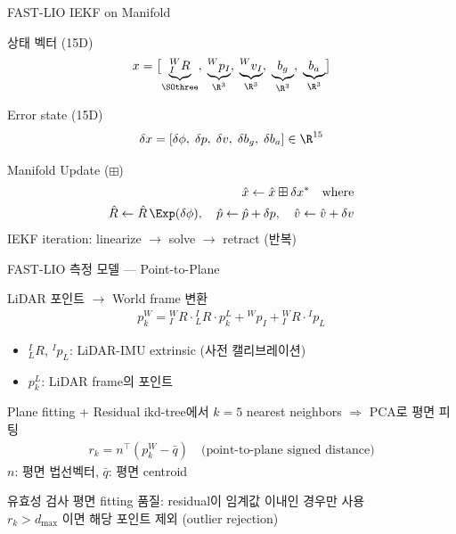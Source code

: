 \begin{frame}{FAST-LIO IEKF on Manifold}
  \begin{block}{상태 벡터 (15D)}
    \begin{align*}
      x = \bigl[\underbrace{{}^W_IR}_{\SOthree},\;
                \underbrace{{}^Wp_I}_{\R^3},\;
                \underbrace{{}^Wv_I}_{\R^3},\;
                \underbrace{b_g}_{\R^3},\;
                \underbrace{b_a}_{\R^3}\bigr]
    \end{align*}
  \end{block}
  \pause
  \begin{block}{Error state (15D)}
    \begin{align*}
      \delta x = [\delta\phi,\; \delta p,\; \delta v,\; \delta b_g,\; \delta b_a]
      \in \R^{15}
    \end{align*}
  \end{block}
  \pause
  \begin{block}{Manifold Update ($\boxplus$)}
    \begin{align*}
      \hat{x} \leftarrow \hat{x} \boxplus \delta x^* \quad \text{where}\\
      \hat{R} \leftarrow \hat{R}\,\Exp(\delta\phi), \quad
      \hat{p} \leftarrow \hat{p} + \delta p, \quad
      \hat{v} \leftarrow \hat{v} + \delta v
    \end{align*}
    IEKF iteration: linearize $\to$ solve $\to$ retract (반복)
  \end{block}
\end{frame}

\begin{frame}[shrink=20]{FAST-LIO 측정 모델 — Point-to-Plane}
  \begin{block}{LiDAR 포인트 $\to$ World frame 변환}
    \begin{align*}
      p_k^W = {}^W_IR \cdot {}^I_LR \cdot p_k^L
              + {}^Wp_I + {}^W_IR \cdot {}^Ip_L
    \end{align*}
    \begin{itemize}
      \item ${}^I_LR$, ${}^Ip_L$: LiDAR-IMU extrinsic (사전 캘리브레이션)
      \item $p_k^L$: LiDAR frame의 포인트
    \end{itemize}
  \end{block}
  \pause
  \begin{block}{Plane fitting + Residual}
    ikd-tree에서 $k=5$ nearest neighbors $\Rightarrow$ PCA로 평면 피팅\\
    \begin{align*}
      r_k = n^\top(p_k^W - \bar{q})
      \quad \text{(point-to-plane signed distance)}
    \end{align*}
    $n$: 평면 법선벡터, $\bar{q}$: 평면 centroid
  \end{block}
  \pause
  \begin{exampleblock}{유효성 검사}
    평면 fitting 품질: residual이 임계값 이내인 경우만 사용\\
    $r_k > d_{\max}$ 이면 해당 포인트 제외 (outlier rejection)
  \end{exampleblock}
\end{frame}

